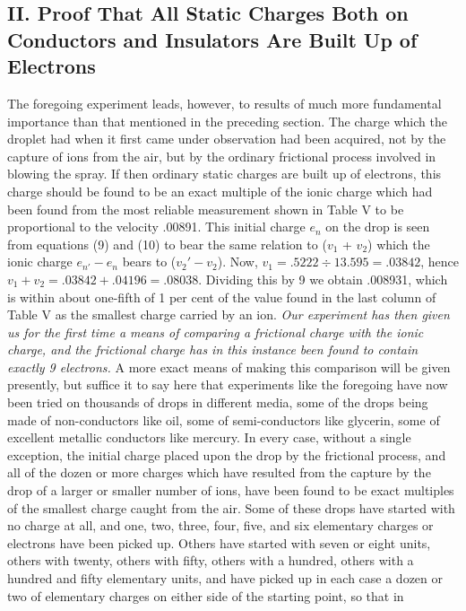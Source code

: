 \subsection*{II. Proof That All Static Charges Both on Conductors and Insulators Are
Built Up of Electrons}

The foregoing experiment leads, however, to results of much more
fundamental im\-por\-tance than that mentioned in the preceding section. The
charge which the droplet had when it first came under observation had
been acquired, not by the capture of ions from the air, but by the
ordinary frictional process involved in blowing the spray. If then
ordinary static charges are built up of electrons, this charge should be
found to be an exact multiple of the ionic charge which had been found
from the most reliable measurement shown in Table V to be proportional
to the velocity .00891. This initial charge $e_n$ on the drop is
seen from equations (9) and (10) to bear the same relation to ($v_1$
+ $v_2$) which the ionic charge $e_{n'} - e_n$ bears to
($v_{2}' - v_2$). Now, $v_1 = .5222\div13.595 = .03842$, hence
$v_1 + v_2 = .03842 + .04196 = .08038$. Dividing this by 9 we
obtain .008931, which is within about one-fifth of 1 per cent of the
value found in the last column of Table V as the smallest charge carried
by an ion. \emph{Our experiment has then given us for the first time a
means of comparing a frictional charge with the ionic charge, and the
frictional charge has in this instance been found to contain exactly 9
electrons.} A more exact means of making this comparison will be given
presently, but suffice it to say here that experiments like the
foregoing have now been tried on thousands of drops in different media,
some of the drops being made of non-conductors like oil, some of
semi-conductors like glycerin, some of excellent metallic conductors
like mercury. In every case, without a single exception, the initial
charge placed upon the drop by the frictional process, and all of the
dozen or more charges which have resulted from the capture by the drop
of a larger or smaller number of ions, have been found to be exact
multiples of the smallest charge caught from the air. Some of these
drops have started with no charge at all, and one, two, three, four,
five, and six elementary charges or electrons have been picked up.
Others have started with seven or eight units, others with twenty,
others with fifty, others with a hundred, others with a hundred and
fifty elementary units, and have picked up in each case a dozen or two
of elementary charges on either side of the starting point, so that in
